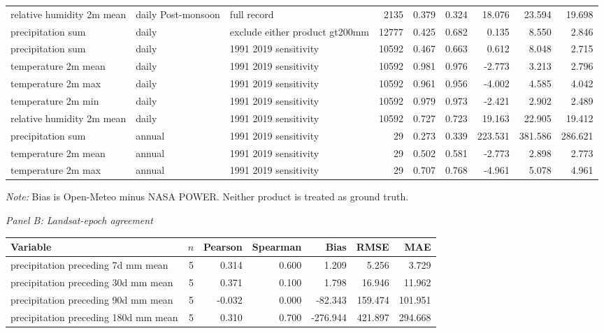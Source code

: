 \begin{landscape}
\begin{longtable}{p{0.18\textwidth}p{0.10\textwidth}p{0.16\textwidth}r r r r r r}
relative humidity 2m mean & daily Post-monsoon & full record & 2135 & 0.379 & 0.324 & 18.076 & 23.594 & 19.698 \\
precipitation sum & daily & exclude either product gt200mm & 12777 & 0.425 & 0.682 & 0.135 & 8.550 & 2.846 \\
precipitation sum & daily & 1991 2019 sensitivity & 10592 & 0.467 & 0.663 & 0.612 & 8.048 & 2.715 \\
temperature 2m mean & daily & 1991 2019 sensitivity & 10592 & 0.981 & 0.976 & -2.773 & 3.213 & 2.796 \\
temperature 2m max & daily & 1991 2019 sensitivity & 10592 & 0.961 & 0.956 & -4.002 & 4.585 & 4.042 \\
temperature 2m min & daily & 1991 2019 sensitivity & 10592 & 0.979 & 0.973 & -2.421 & 2.902 & 2.489 \\
relative humidity 2m mean & daily & 1991 2019 sensitivity & 10592 & 0.727 & 0.723 & 19.163 & 22.905 & 19.412 \\
precipitation sum & annual & 1991 2019 sensitivity & 29 & 0.273 & 0.339 & 223.531 & 381.586 & 286.621 \\
temperature 2m mean & annual & 1991 2019 sensitivity & 29 & 0.502 & 0.581 & -2.773 & 2.898 & 2.773 \\
temperature 2m max & annual & 1991 2019 sensitivity & 29 & 0.707 & 0.768 & -4.961 & 5.078 & 4.961 \\
\end{longtable}
\noindent\textit{Note:} Bias is Open-Meteo minus NASA POWER. Neither product is treated as ground truth.
\endgroup
\par\medskip\noindent\textit{Panel B: Landsat-epoch agreement}\par
\begingroup
\scriptsize
\setlength{\tabcolsep}{3pt}
\begin{center}
\begin{adjustbox}{max width=\linewidth}
\begin{tabular}{p{}rrrrrr}
\toprule
Variable & $n$ & Pearson & Spearman & Bias & RMSE & MAE \\
\midrule
precipitation preceding 7d mm mean & 5 & 0.314 & 0.600 & 1.209 & 5.256 & 3.729 \\
precipitation preceding 30d mm mean & 5 & 0.371 & 0.100 & 1.798 & 16.946 & 11.962 \\
precipitation preceding 90d mm mean & 5 & -0.032 & 0.000 & -82.343 & 159.474 & 101.951 \\
precipitation preceding 180d mm mean & 5 & 0.310 & 0.700 & -276.944 & 421.897 & 294.668 \\

\end{tabular}
\end{adjustbox}
\end{center}
\end{landscape}
